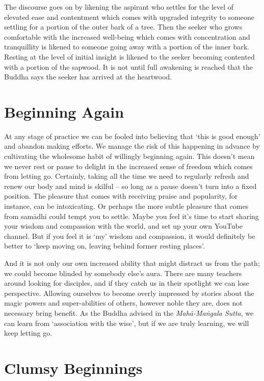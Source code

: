 The discourse goes on by likening the aspirant who settles for the level
of elevated ease and contentment which comes with upgraded integrity to
someone settling for a portion of the outer bark of a tree. Then the
seeker who grows comfortable with the increased well-being which comes
with concentration and tranquillity is likened to someone going away
with a portion of the inner bark. Resting at the level of initial
insight is likened to the seeker becoming contented with a portion of
the sapwood. It is not until full awakening is reached that the Buddha
says the seeker has arrived at the heartwood.

\section{Beginning Again}

At any stage of practice we can be fooled into believing that ‘this is
good enough’ and abandon making efforts. We manage the risk of this
happening in advance by cultivating the wholesome habit of willingly
beginning again. This doesn’t mean we never rest or pause to delight in
the increased sense of freedom which comes from letting go. Certainly,
taking all the time we need to regularly refresh and renew our body and
mind is skilful – so long as a pause doesn’t turn into a fixed position.
The pleasure that comes with receiving praise and popularity, for
instance, can be intoxicating. Or perhaps the more subtle pleasure that
comes from samādhi could tempt you to settle. Maybe you feel it’s time
to start sharing your wisdom and compassion with the world, and set up
your own YouTube channel. But if you feel it is ‘my’ wisdom and
compassion, it would definitely be better to ‘keep moving on, leaving
behind former resting places’.

And it is not only our own increased ability that might distract us from
the path; we could become blinded by somebody else’s aura. There are
many teachers around looking for disciples, and if they catch us in
their spotlight we can lose perspective. Allowing ourselves to become
overly impressed by stories about the magic powers and super-abilities
of others, however noble they are, does not necessary bring benefit. As
the Buddha advised in
the \emph{Mahā-Maṅgala Sutta},\cite{mahamangala-sutta}
we can learn from ‘association with the wise’, but if we are truly learning, we will keep
letting go.

\section{Clumsy Beginnings}

